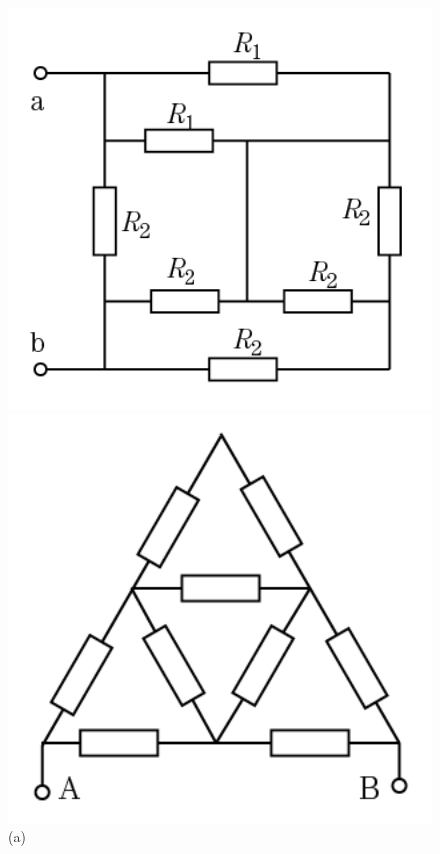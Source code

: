 \documentclass[hyperref, UTF8]{ctexart}
\begin{document}
\begin{figure}[!htb]
  \centering
  \begin{minipage}[t]{0.251\textwidth}
    \centering
    \includegraphics[width=1\textwidth]{p2-3-a.png}
    \caption*{(a)}
  \end{minipage}
  \begin{minipage}[t]{0.212\textwidth}
    \centering
    \includegraphics[width=1\textwidth]{p2-4-b.png}

\end{minipage}
\end{figure}
\end{document}
